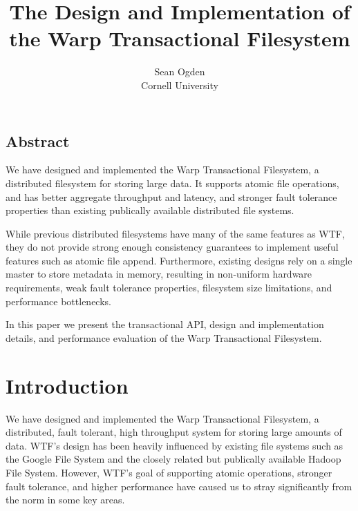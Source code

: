 \documentclass[letterpaper,twocolumn,10pt]{article}
\begin{document}
\date{}

\title{\Large \bf The Design and Implementation of the Warp Transactional Filesystem}

\author{
{\rm Sean Ogden}\\
Cornell University
} %

\maketitle

\thispagestyle{empty}


\subsection*{Abstract}
We have designed and implemented the Warp Transactional
Filesystem, a distributed filesystem for storing large
data.  It supports atomic file operations, and has
better aggregate throughput and latency, and stronger fault
tolerance properties than existing publically available
distributed file systems.

While previous distributed filesystems have many of the
same features as WTF, they do not provide strong enough
consistency guarantees to implement useful features such
as atomic file append.  Furthermore, existing designs
rely on a single master to store metadata in memory,
resulting in non-uniform hardware requirements, weak fault
tolerance properties, filesystem size limitations, 
and performance bottlenecks.

In this paper we present the transactional API, 
design and implementation details, and performance
evaluation of the Warp Transactional Filesystem.

\section{Introduction}

We have designed and implemented the Warp Transactional Filesystem,
a distributed, fault tolerant, high throughput system
for storing large amounts of data.  WTF's design has been
heavily influenced by existing file systems such as the Google File System
and the closely related but publically available Hadoop File System.
However, WTF's goal of supporting atomic operations, stronger fault
tolerance, and higher performance have caused us to stray significantly
from the norm in some key areas.
\end{document}
